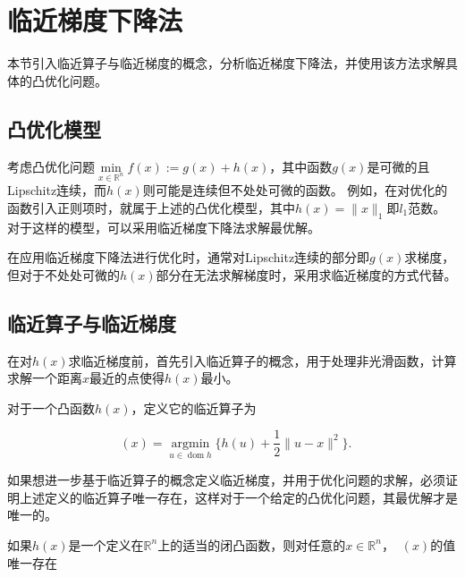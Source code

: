 \section{临近梯度下降法}

本节引入临近算子与临近梯度的概念，分析临近梯度下降法，并使用该方法求解具体的凸优化问题。

\subsection{凸优化模型}

考虑凸优化问题$\min\limits_{x\in \mathbb{R}^{n}} f(x) := g(x) + h(x)$，其中函数$g(x)$是可微的且Lipschitz连续，而$h(x)$则可能是连续但不处处可微的函数。
例如，在对优化的函数引入正则项时，就属于上述的凸优化模型，其中$h(x)=\|x\|_{1}$即$l_{1}$范数。对于这样的模型，可以采用临近梯度下降法求解最优解。

在应用临近梯度下降法进行优化时，通常对Lipschitz连续的部分即$g(x)$求梯度，但对于不处处可微的$h(x)$部分在无法求解梯度时，采用求临近梯度的方式代替。

\subsection{临近算子与临近梯度}

在对$h(x)$求临近梯度\cite{2014Prox}前，首先引入临近算子的概念，用于处理非光滑函数，计算求解一个距离$x$最近的点使得$h(x)$最小。

\begin{definition}\label{def_prox_1}
    对于一个凸函数$h(x)$，定义它的临近算子为

    \begin{equation}
        \mathop{\mathrm{prox_{h}}}(x) = \mathop{\mathrm{argmin}}\limits_{u\in \mathop{\mathrm{dom}} h}\{h(u)+\frac{1}{2}\|u-x\|^{2}\}.
    \end{equation}

\end{definition}

如果想进一步基于临近算子的概念定义临近梯度，并用于优化问题的求解，必须证明上述定义的临近算子唯一存在，这样对于一个给定的凸优化问题，其最优解才是唯一的。

\begin{theorem}\label{thm_prox_1}
    如果$h(x)$是一个定义在$\mathbb{R}^{n}$上的适当的闭凸函数，则对任意的$x\in \mathbb{R}^{n}$，$\mathop{\mathrm{prox_{h}}}(x)$的值唯一存在
\end{theorem}

